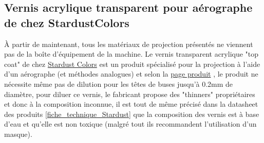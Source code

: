 \newpage
\subsection{Vernis acrylique transparent pour aérographe de chez StardustColors}

À partir de maintenant, tous les matériaux de projection présentés ne viennent pas de la boîte d'équipement de la machine.
Le vernis transparent acrylique "top coat" de chez \href{https://www.stardustcolors.co.uk/}{Stardust Colors} est un produit spécialisé
pour la projection à l'aide d'un aérographe (et méthodes analogues) et selon la \href{https://www.stardustcolors.co.uk/stardust-acrylic-pro-series/1270-airbrush-acrylic-polyurethane-topcoats-matt-satin-or-gloss-3700730801942.html}{page produit}\footnotemark
{}, le produit ne nécessite même pas de dilution pour les têtes de buses jusqu'à 0.2mm de diamètre,
pour diluer ce vernis, le fabricant propose des "thinners" propriétaires et donc à la composition inconnue, il est tout de même précisé dans la datasheet des produits \autoref{fiche_technique_Stardust}
que la composition des vernis est à base d'eau et qu'elle est non toxique (malgré tout ils recommandent l'utilisation d'un masque).

